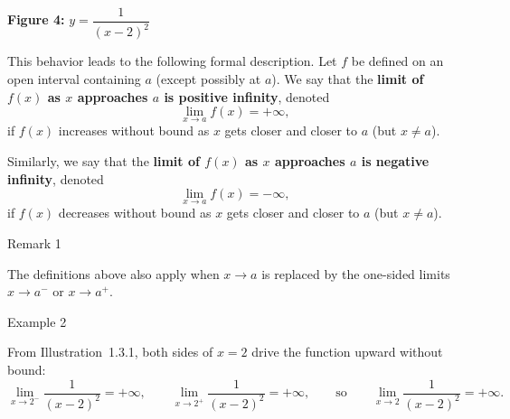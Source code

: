 \vspace{0.5em}
{\centering
{}

\nopagebreak\medskip
\small\textbf{Figure 4:} \(y = \dfrac{1}{(x-2)^{2}}\)\par}
\vspace{0.5em}

\medskip

This behavior leads to the following formal description. Let \(f\) be defined on an open interval containing \(a\) (except possibly at \(a\)). We say that the \textbf{limit of \(f(x)\) as \(x\) approaches \(a\) is positive infinity}, denoted
\[
\lim_{x \to a} f(x) = +\infty,
\]
if \(f(x)\) increases without bound as \(x\) gets closer and closer to \(a\) (but \(x \neq a\)).

Similarly, we say that the \textbf{limit of \(f(x)\) as \(x\) approaches \(a\) is negative infinity}, denoted
\[
\lim_{x \to a} f(x) = -\infty,
\]
if \(f(x)\) decreases without bound as \(x\) gets closer and closer to \(a\) (but \(x \neq a\)).


\begin{remarkbox}{Remark 1}

The definitions above also apply when \(x \to a\) is replaced by the one-sided limits \(x \to a^{-}\) or \(x \to a^{+}\).
\end{remarkbox}


\begin{examplebox}{Example 2}

From Illustration~1.3.1, both sides of \(x = 2\) drive the function upward without bound:
\[
\lim_{x \to 2^{-}} \frac{1}{(x - 2)^{2}} = +\infty,
\qquad
\lim_{x \to 2^{+}} \frac{1}{(x - 2)^{2}} = +\infty,
\qquad\text{so}\qquad
\lim_{x \to 2} \frac{1}{(x - 2)^{2}} = +\infty.
\]
\end{examplebox}



